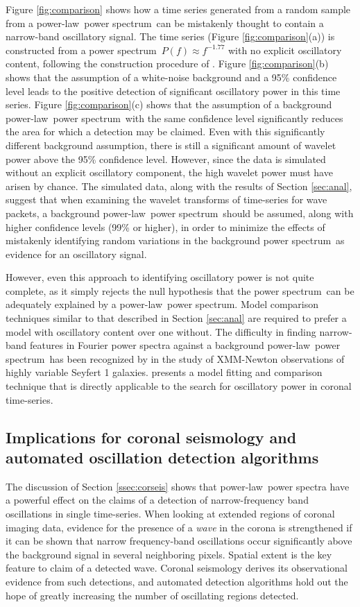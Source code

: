 \documentclass{aastex}
\newcommand{\PS}{power spectrum}
\newcommand{\PL}{power-law}
\begin{document}
Figure \ref{fig:comparison} shows how a time series generated from a
random sample from a \PL\ \PS\ can be mistakenly thought to contain a
narrow-band oscillatory signal.  The time series (Figure
\ref{fig:comparison}(a)) is constructed from a \PS\ $P(f)\approx
f^{-1.77}$ with no explicit oscillatory content, following the
construction procedure of \cite{2010MNRAS.402..307V}.  Figure
\ref{fig:comparison}(b) shows that the assumption of a white-noise
background and a 95\% confidence level leads to the positive detection
of significant oscillatory power in this time series. Figure
\ref{fig:comparison}(c) shows that the assumption of a background
\PL\ \PS\ with the same confidence level significantly reduces the
area for which a detection may be claimed.  Even with this
significantly different background assumption, there is still a
significant amount of wavelet power above the 95\% confidence level.
However, since the data is simulated without an explicit oscillatory
component, the high wavelet power must have arisen by chance.  The
simulated data, along with the results of Section \ref{sec:anal},
suggest that when examining the wavelet transforms of time-series for
wave packets, a background \PL\ \PS\ should be assumed, along with
higher confidence levels (99\% or higher), in order to minimize the
effects of mistakenly identifying random variations in the background
\PS\ as evidence for an oscillatory signal.

However, even this approach to identifying oscillatory power is not
quite complete, as it simply rejects the null hypothesis that the
\PS\ can be adequately explained by a \PL\ \PS.  Model comparison
techniques similar to that described in Section \ref{sec:anal} are
required to prefer a model with oscillatory content over one
without. The difficulty in finding narrow-band features in Fourier
power spectra against a background \PL\ \PS\ has been recognized by
\cite{2010MNRAS.402..307V} in the study of XMM-Newton observations of
highly variable Seyfert 1 galaxies.  \cite{2010MNRAS.402..307V}
presents a model fitting and comparison technique that is directly
applicable to the search for oscillatory power in coronal time-series.

\subsection{Implications for coronal seismology and automated
  oscillation detection algorithms}\label{sec:oscdetect}

The discussion of Section \ref{ssec:corseis} shows that \PL\ power
spectra have a powerful effect on the claims of a detection of
narrow-frequency band oscillations in single time-series.  When
looking at extended regions of coronal imaging data, evidence for the
presence of a {\it wave} in the corona is strengthened if it can be
shown that narrow frequency-band oscillations occur significantly
above the background signal in several neighboring pixels.  Spatial
extent is the key feature to claim of a detected wave.  Coronal
seismology derives its observational evidence from such detections,
and automated detection algorithms hold out the hope of greatly
increasing the number of oscillating regions detected.
\end{document}
